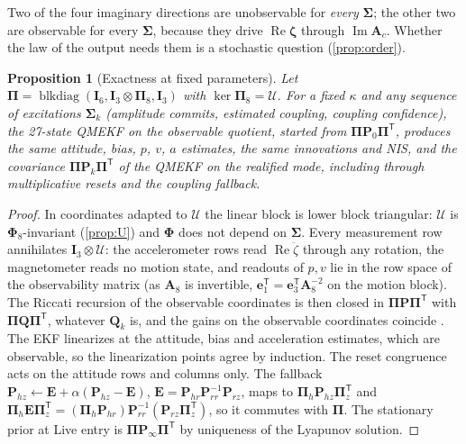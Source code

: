 \documentclass[conference]{IEEEtran}
\DeclareRobustCommand{\vct}[1]{\bm{#1}}
\DeclareRobustCommand{\mat}[1]{\bm{#1}}
\newcommand{\T}{^{\mathsf T}}
\renewcommand{\Re}{\operatorname{Re}}
\renewcommand{\Im}{\operatorname{Im}}
\theoremstyle{bodysmall}
\newtheorem{proposition}{Proposition}
\begin{document}
Two of the four imaginary directions are unobservable for \emph{every}
$\mat\Sigma$; the other two are observable for every $\mat\Sigma$, because
they drive $\Re\vct\zeta$ through $\Im\mat A_c$. Whether the law of the output
needs them is a stochastic question (\cref{prop:order}).

\begin{proposition}[Exactness at fixed parameters]
\label{prop:exact}
Let $\mat\Pi=\operatorname{blkdiag}(\mat I_6,\mat I_3\otimes\mat\Pi_8,\mat I_3)$
with $\ker\mat\Pi_8=\mathcal U$. For a fixed $\kappa$ and \emph{any} sequence
of excitations $\mat\Sigma_k$ (amplitude commits, estimated coupling,
coupling confidence), the 27-state QMEKF on the observable quotient, started
from $\mat\Pi\mat P_0\mat\Pi\T$, produces the same attitude, bias, $p$, $v$,
$a$ estimates, the same innovations and NIS, and the covariance
$\mat\Pi\mat P_k\mat\Pi\T$ of the QMEKF on the realified mode, including
through multiplicative resets and the coupling fallback.
\end{proposition}
\begin{proof}
In coordinates adapted to $\mathcal U$ the linear block is lower block
triangular: $\mathcal U$ is $\mat\Phi_8$-invariant (\cref{prop:U}) and
$\mat\Phi$ does not depend on $\mat\Sigma$. Every measurement row annihilates
$\mat I_3\otimes\mathcal U$: the accelerometer rows read $\Re\ddot\zeta$ through
any rotation, the magnetometer reads no motion state, and readouts of $p,v$
lie in the row space of the observability matrix (as $\mat A_8$ is
invertible, $\vct e_1\T=\vct e_3\T\mat A_8^{-2}$ on the motion block). The
Riccati recursion of the observable coordinates is then closed in
$\mat\Pi\mat P\mat\Pi\T$ with $\mat\Pi\mat Q\mat\Pi\T$, whatever $\mat Q_k$ is,
and the gains on the observable coordinates coincide \cite{kalman63,andersonmoore79}.
The EKF linearizes at the attitude, bias and acceleration estimates, which
are observable, so the linearization points agree by induction. The reset
congruence acts on the attitude rows and columns only. The fallback
$\mat P_{hz}\leftarrow\mat E+\alpha(\mat P_{hz}-\mat E)$,
$\mat E=\mat P_{hr}\mat P_{rr}^{-1}\mat P_{rz}$, maps to
$\mat\Pi_h\mat P_{hz}\mat\Pi_z\T$ and $\mat\Pi_h\mat E\mat\Pi_z\T=(\mat\Pi_h\mat P_{hr})\mat P_{rr}^{-1}(\mat P_{rz}\mat\Pi_z\T)$,
so it commutes with $\mat\Pi$. The stationary prior at Live entry is
$\mat\Pi\mat P_\infty\mat\Pi\T$ by uniqueness of the Lyapunov solution.
\end{proof}
\end{document}
